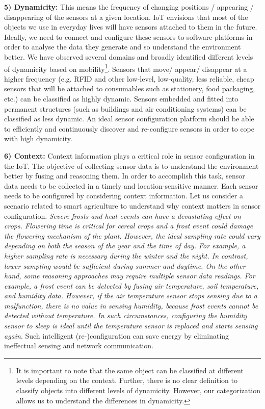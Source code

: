 \documentclass[graybox]{svmult}
\begin{document}
\textbf{5) Dynamicity:} This means the frequency of changing positions / appearing / disappearing of the sensors at a given location.  IoT envisions that most of the objects we use in everyday lives will have sensors attached to them in the future. Ideally, we need to connect and configure these sensors to software platforms in order to analyse the data they generate and so understand the environment better. We have observed several domains and broadly identified different levels of dynamicity based on mobility\footnote{It is important to note that the same object can be classified at different levels depending on the context. Further, there is no clear definition to classify objects into different levels of dynamicity. However, our categorization allows us to understand the differences in dynamicity.}. Sensors that move/ appear/ disappear at a higher frequency (e.g. RFID and other low-level, low-quality, less reliable, cheap sensors that will be attached to consumables such as stationery, food packaging, etc.) can be classified as highly dynamic. Sensors embedded and fitted into permanent structures (such as buildings and air conditioning systems) can be classified as less dynamic. An ideal sensor configuration platform should be able to efficiently and continuously discover and re-configure sensors in order to cope with high dynamicity.



\textbf{6) Context:} Context information plays a critical role in sensor configuration in the IoT. The objective of collecting sensor data is to understand the environment better by fusing and reasoning  them. In order to accomplish this task, sensor data needs to be collected in a timely and location-sensitive manner. Each sensor needs to be configured by considering context information. Let us consider a scenario related to smart agriculture to understand why context matters in sensor configuration. \textit{Severe frosts and heat events can have a devastating effect on crops. Flowering time is critical for cereal crops and a frost event could damage the flowering mechanism of the plant. However, the ideal sampling rate could vary depending on both the season of the year and the time of day. For example, a higher sampling rate is necessary during the winter and the night. In contrast, lower sampling would be sufficient during summer and daytime. On the other hand, some reasoning approaches may require multiple sensor data readings. For example, a frost event can be detected by fusing air temperature, soil temperature, and humidity data. However, if the air temperature sensor stops sensing due to a malfunction, there is no value in sensing humidity, because frost events cannot be detected without temperature. In such circumstances, configuring the humidity sensor to sleep is ideal until the temperature sensor is replaced and starts sensing again}. Such intelligent (re-)configuration can save energy by eliminating  ineffectual  sensing and network communication.
\end{document}
